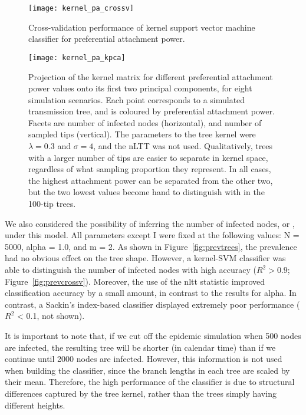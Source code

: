 \begin{figure}[ht]
  \centering
  \label{fig:pacrossv}
  \texttt{[image: kernel\_pa\_crossv]}
  \caption[Cross-validation performance of kernel support vector machine
  classifier for preferential attachment power]{
    Cross-validation performance of kernel support vector machine classifier
    for preferential attachment power.
  }
\end{figure}

\begin{figure}[ht]
  \centering
  \label{fig:pakpca}
  \texttt{[image: kernel\_pa\_kpca]}
  \caption[Projection of kernel matrix for different attachment power values
  onto its first two principal components]{
    Projection of the kernel matrix for different preferential attachment power
    values onto its first two principal components, for eight simulation
    scenarios. Each point corresponds to a simulated transmission tree, and is
    coloured by preferential attachment power. Facets are number of infected
    nodes (horizontal), and number of sampled tips (vertical). The parameters
    to the tree kernel were $\lambda = 0.3$ and $\sigma = 4$, and the nLTT was
    not used. Qualitatively, trees with a larger number of tips are easier to
    separate in kernel space, regardless of what sampling proportion they
    represent. In all cases, the highest attachment power can be separated from
    the other two, but the two lowest values become hand to distinguish with in
    the 100-tip trees.
  }
\end{figure}

We also considered the possibility of inferring the number of infected nodes,
or , under this model. All parameters except \gls{I} were
fixed at the following values: \gls{N} = 5000, \gls{alpha} = 1.0, and \gls{m} =
2. As shown in Figure~\ref{fig:prevtrees}, the prevalence had no obvious effect
on the tree shape. However, a kernel-\gls{SVM} classifier was able to
distinguish the number of infected nodes with high accuracy ($R^2 > 0.9$;
Figure~\ref{fig:prevcrossv}). Moreover, the use of the \gls{nltt} statistic
improved classification accuracy by a small amount, in contrast to the results
for \gls{alpha}. In contrast, a Sackin's index-based classifier displayed
extremely poor performance ($R^2$ < 0.1, not shown). 

It is important to note that, if we cut off the epidemic simulation when 500
nodes are infected, the resulting tree will be shorter (in calendar time) than
if we continue until 2000 nodes are infected. However, this information is not
used when building the classifier, since the branch lengths in each tree are
scaled by their mean. Therefore, the high performance of the classifier is due
to structural differences captured by the tree kernel, rather than the trees
simply having different heights.

